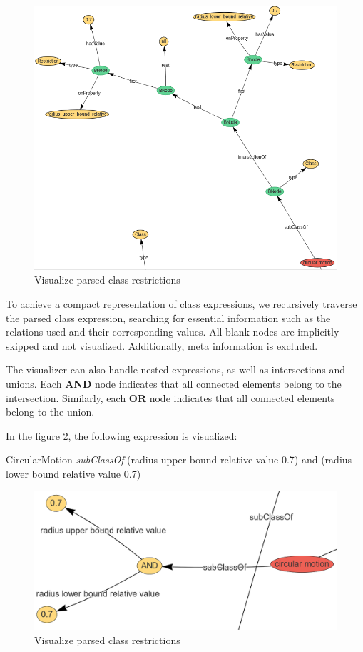 \begin{figure}[H]
    \includegraphics[scale=0.5]{Graphics/OwlVisualizer/graphProcessing2.png}
    \centering
    \caption{Visualize parsed class restrictions}
    \label{fig:graphProcessing2}
\end{figure}

To achieve a compact representation of class expressions, we recursively traverse the parsed class expression, 
searching for essential information such as the relations used and their corresponding values. 
All blank nodes are implicitly skipped and not visualized. Additionally, meta information is excluded.

The visualizer can also handle nested expressions, as well as intersections and unions. Each \textbf{AND} node indicates that all connected elements belong to the intersection.
Similarly, each \textbf{OR} node indicates that all connected elements belong to the union.

In the figure \ref{fig:graphProcessing3}, the following expression is visualized:

CircularMotion \textit{subClassOf} (radius upper bound relative value 0.7) and (radius lower bound relative value 0.7)

\begin{figure}[H]
    \includegraphics[scale=0.3]{Graphics/OwlVisualizer/graphProcessing3.png}
    \centering
    \caption{Visualize parsed class restrictions}
    \label{fig:graphProcessing3}
\end{figure}

